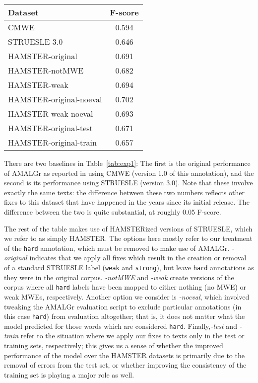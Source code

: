 \documentclass[output=paper
,modfonts
,nonflat]{langsci/langscibook}
\newcommand{\mwetype}[1]{\texttt{#1}\xspace}
\newcommand{\strongish}{\mwetype{strong}}
\newcommand{\weak}{\mwetype{weak}}
\newcommand{\hard}{\mwetype{hard}}
\newcommand{\tableref}[1]{Table~\ref{#1}\xspace}
\begin{document}
\begin{table*}[t!]
\begin{tabular}{l c}
\toprule
\textbf{Dataset}&\textbf{F-score}\\
\midrule
CMWE \citep{Schneider14b} & 0.594\\
STRUESLE 3.0 & 0.646 \\
\midrule
HAMSTER-original & 0.691 \\ 
HAMSTER-notMWE & 0.682 \\
HAMSTER-weak & 0.694 \\
\midrule
HAMSTER-original-noeval & 0.702 \\
HAMSTER-weak-noeval & 0.693\\
\midrule
HAMSTER-original-test & 0.671\\
HAMSTER-original-train  & 0.657 \\

\bottomrule
\end{tabular}%
\caption{AMALGr F-scores for various versions of MWE annotation of EWT Reviews} %
\label{tab:exp1} %
\end{table*}

There are two baselines in \tableref{tab:exp1}: The first is the original performance of AMALGr as reported in \citet{Schneider14b} using CMWE (version 1.0 of this annotation), and the second is its performance using STRUESLE (version 3.0). Note that these involve exactly the same texts: the difference between these two numbers reflects other fixes to this dataset that have happened in the years since its initial release. The difference between the two is quite substantial, at roughly 0.05 F-score.

The rest of the table makes use of HAMSTERized versions of STRUESLE, which we refer to as simply HAMSTER. The options here mostly refer to our treatment of the \hard annotation, which must be removed to make use of AMALGr. \emph{-original} indicates that we apply all fixes which result in the creation or removal of a standard STRUESLE label (\ie \weak and \strongish), but leave \hard annotations as they were in the original corpus. \emph{-notMWE} and \emph{-weak} create versions of the corpus where all \hard labels have been mapped to either nothing (no MWE) or weak MWEs, respectively. Another option we consider is \emph{-noeval}, which involved tweaking the AMALGr evaluation script to exclude particular annotations (in this case \hard) from evaluation altogether; that is, it does not matter what the model predicted for those words which are considered \hard. Finally,\emph{-test} and \emph{-train} refer to the situation where we apply our fixes to texts only in the test or training sets, respectively; this gives us a sense of whether the improved performance of the model over the HAMSTER datasets is primarily due to the removal of errors from the test set, or whether improving the consistency of the training set is playing a major role as well.
\end{document}
